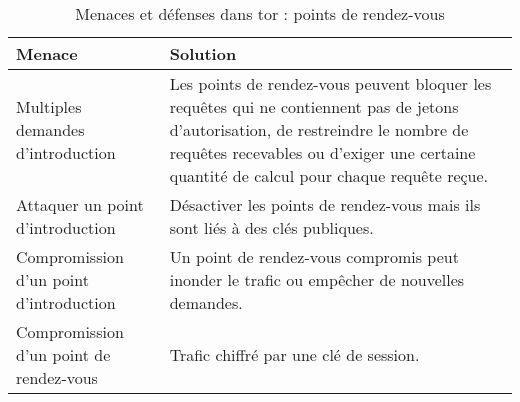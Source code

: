 \begin{table}[htpb]
    \centering
    \begin{tabularx}{\textwidth}{
        >{\raggedright\arraybackslash}p{4.5cm}
        >{\raggedright\arraybackslash}X}
            \toprule
            \rowcolor[HTML]{EFEFEF}
            \textbf{Menace}                         & \textbf{Solution} \\
            \midrule
            Multiples demandes d'introduction       & Les points de rendez-vous peuvent bloquer les requêtes qui ne contiennent pas de jetons d'autorisation, de restreindre le nombre de requêtes recevables ou d'exiger une certaine quantité de calcul pour chaque requête reçue. \\
            \midrule
            Attaquer un point d'introduction        & Désactiver les points de rendez-vous mais ils sont liés à des clés publiques.  \\
            \midrule
            Compromission d'un point d'introduction & Un point de rendez-vous compromis peut inonder le trafic ou empêcher de nouvelles demandes.  \\
            \midrule
            Compromission d'un point de rendez-vous & Trafic chiffré par une clé de session. \\
            \bottomrule
    \end{tabularx}
    \caption{Menaces et défenses dans \acrshort{tor} : points de rendez-vous}
    \label{tab:ad-rdvp}
\end{table}
